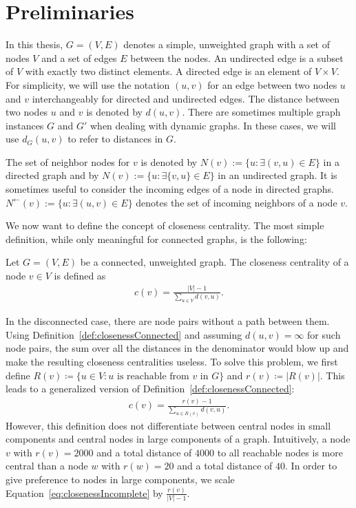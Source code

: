 \chapter{Preliminaries}
\label{ch:preliminaries}

In this thesis, $G = (V, E)$ denotes a simple, unweighted graph with a set of nodes $V$ and a set of edges $E$ between the nodes. An undirected edge is a subset of $V$ with exactly two distinct elements. A directed edge is an element of $V \times V$. For simplicity, we will use the notation $(u, v)$ for an edge between two nodes $u$ and $v$ interchangeably for directed and undirected edges. The distance between two nodes $u$ and $v$ is denoted by $d(u, v)$. There are sometimes multiple graph instances $G$ and $G'$ when dealing with dynamic graphs. In these cases, we will use $d_G(u, v)$ to refer to distances in $G$.

The set of neighbor nodes for $v$ is denoted by $N(v) := \{u : \exists (v, u) \in E\}$ in a directed graph and by $N(v) := \{u : \exists \{v, u\} \in E\}$ in an undirected graph. It is sometimes useful to consider the incoming edges of a node in directed graphs. $N^{\leftarrow}(v) := \{u : \exists (u, v) \in E\}$ denotes the set of incoming neighbors of a node $v$.

We now want to define the concept of closeness centrality. The most simple definition, while only meaningful for connected graphs, is the following:

\begin{definition}
\label{def:closenessConnected}
Let $G = (V, E)$ be a connected, unweighted graph. The closeness centrality of a node $v \in V$ is defined as
\begin{align*}
	c(v) = \frac{|V| - 1}{\sum_{u \in V}{d(v, u)}}.
\end{align*}
\end{definition}

In the disconnected case, there are node pairs without a path between them. Using Definition~\ref{def:closenessConnected} and assuming $d(u, v) = \infty$ for such node pairs, the sum over all the distances in the denominator would blow up and make the resulting closeness centralities useless. To solve this problem, we first define $R(v) \coloneqq \{u \in V : u \text{ is reachable from }v \text{ in } G\}$ and $r(v) \coloneqq |R(v)|$. This leads to a generalized version of Definition~\ref{def:closenessConnected}:
\begin{align}
	c(v) = \frac{r(v) - 1}{\sum_{u \in R(v)}{d(v, u)}}. \label{eq:closenessIncomplete}
\end{align}
However, this definition does not differentiate between central nodes in small components and central nodes in large components of a graph. Intuitively, a node $v$ with $r(v) = 2000$ and a total distance of $4000$ to all reachable nodes is more central than a node $w$ with $r(w) = 20$ and a total distance of $40$. In order to give preference to nodes in large components, we scale Equation~\ref{eq:closenessIncomplete} by $\frac{r(v)}{|V| - 1}$. 

